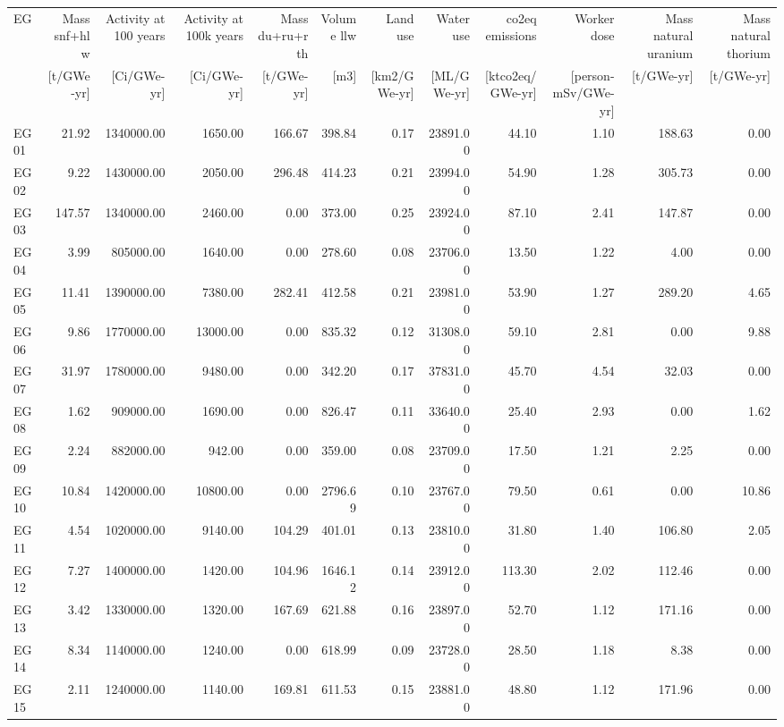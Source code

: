 \begin{tabular}{lrrrrrrrrrrr}
\toprule
EG & Mass \acs{snf}+\acs{hlw} & Activity at 100 years & Activity at 100k years & Mass \acs{du}+\acs{ru}+\acs{rth}& Volume \acs{llw} & Land use & Water use & \acs{co2eq} emissions & Worker dose & Mass natural uranium & Mass natural thorium \\
& [t/GWe-yr] & [Ci/GWe-yr] & [Ci/GWe-yr] & [t/GWe-yr] & [m3] & [km2/GWe-yr] & [ML/GWe-yr] & [kt\acs{co2eq}/GWe-yr] & [person-mSv/GWe-yr] & [t/GWe-yr] & [t/GWe-yr] \\
\midrule
EG01 & 21.92 & 1340000.00 & 1650.00 & 166.67 & 398.84 & 0.17 & 23891.00 & 44.10 & 1.10 & 188.63 & 0.00 \\
EG02 & 9.22 & 1430000.00 & 2050.00 & 296.48 & 414.23 & 0.21 & 23994.00 & 54.90 & 1.28 & 305.73 & 0.00 \\
EG03 & 147.57 & 1340000.00 & 2460.00 & 0.00 & 373.00 & 0.25 & 23924.00 & 87.10 & 2.41 & 147.87 & 0.00 \\
EG04 & 3.99 & 805000.00 & 1640.00 & 0.00 & 278.60 & 0.08 & 23706.00 & 13.50 & 1.22 & 4.00 & 0.00 \\
EG05 & 11.41 & 1390000.00 & 7380.00 & 282.41 & 412.58 & 0.21 & 23981.00 & 53.90 & 1.27 & 289.20 & 4.65 \\
EG06 & 9.86 & 1770000.00 & 13000.00 & 0.00 & 835.32 & 0.12 & 31308.00 & 59.10 & 2.81 & 0.00 & 9.88 \\
EG07 & 31.97 & 1780000.00 & 9480.00 & 0.00 & 342.20 & 0.17 & 37831.00 & 45.70 & 4.54 & 32.03 & 0.00 \\
EG08 & 1.62 & 909000.00 & 1690.00 & 0.00 & 826.47 & 0.11 & 33640.00 & 25.40 & 2.93 & 0.00 & 1.62 \\
EG09 & 2.24 & 882000.00 & 942.00 & 0.00 & 359.00 & 0.08 & 23709.00 & 17.50 & 1.21 & 2.25 & 0.00 \\
EG10 & 10.84 & 1420000.00 & 10800.00 & 0.00 & 2796.69 & 0.10 & 23767.00 & 79.50 & 0.61 & 0.00 & 10.86 \\
EG11 & 4.54 & 1020000.00 & 9140.00 & 104.29 & 401.01 & 0.13 & 23810.00 & 31.80 & 1.40 & 106.80 & 2.05 \\
EG12 & 7.27 & 1400000.00 & 1420.00 & 104.96 & 1646.12 & 0.14 & 23912.00 & 113.30 & 2.02 & 112.46 & 0.00 \\
EG13 & 3.42 & 1330000.00 & 1320.00 & 167.69 & 621.88 & 0.16 & 23897.00 & 52.70 & 1.12 & 171.16 & 0.00 \\
EG14 & 8.34 & 1140000.00 & 1240.00 & 0.00 & 618.99 & 0.09 & 23728.00 & 28.50 & 1.18 & 8.38 & 0.00 \\
EG15 & 2.11 & 1240000.00 & 1140.00 & 169.81 & 611.53 & 0.15 & 23881.00 & 48.80 & 1.12 & 171.96 & 0.00 \\

\end{tabular}
